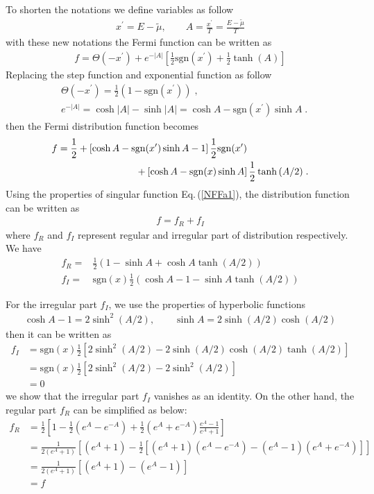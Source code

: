 \documentclass[sn-mathphys,Numbered]{sn-jnl}
\theoremstyle{thmstyleone}%
\theoremstyle{thmstyletwo}%
\theoremstyle{thmstylethree}%
\begin{document}
To shorten the notations we define variables as follow
\begin{align}
x^\prime=E-\tilde\mu,\qquad A = \frac{x^\prime}{T}= \frac{E-\tilde\mu}{T}
\end{align}
with these new notations the Fermi function can be written as
\begin{align}
f=\Theta(-x^\prime)+e^{-|A|}\left[\frac{1}{2}\mathrm{sgn}\left(x^\prime\right) 
 +\frac{1}{2}\tanh\left(A\right)\right]
\end{align}
Replacing the step function and exponential function as  follow
 \begin{align}\label{NFF4}
&\Theta(-x^\prime)=\frac 1 2 (1-\mathrm{sgn}(x^\prime))\;,\\ 
&e^{-|A|}=\cosh|A|-\sinh|A|=\cosh A- \mathrm{sgn}(x^\prime)\sinh A\;.
\end{align}
then the Fermi distribution function becomes
\begin{align}
f=\frac{1}{2} &+\left[\cosh {A}- \mathrm{sgn}(x^\prime)\sinh{A} -1\right]\frac{1}{2} \mathrm{sgn}(x^\prime)\notag\\
 &\qquad\qquad\qquad+\left[\cosh{A}- \mathrm{sgn}(x)\sinh{A} \right]\frac{1}{2}\tanh{(A/2)}\;.
\end{align}
Using the properties of singular function  Eq.\,(\ref{NFFa1}), the distribution function can be written as
\begin{align}
f=f_R+f_I
\end{align}
where $f_R$ and $f_I$ represent regular and irregular part of distribution respectively. We have
\begin{align}\label{NFF5a}
 f_R=& \frac{1}{2}\left(1-\sinh A +\cosh A \tanh (A/2)\right) \\
 f_I=& \mathrm{sgn}(x) \frac{1}{2} \left(\cosh A-1 - \sinh A \tanh (A/2)\right)
 \label{NFF5b}
\end{align}

For the irregular part $f_I$, we use the properties of hyperbolic functions
\begin{align}
\cosh A-1= 2\sinh^2(A/2), \qquad\sinh A=2 \sinh(A/2) \cosh(A/2)
\end{align}
then it can be written as
\begin{align}
f_I&=\mathrm{sgn}(x) \frac{1}{2} \left[ 2\sinh^2(A/2) - 2 \sinh(A/2) \cosh(A/2) \tanh (A/2)\right]\\
&=\mathrm{sgn}(x) \frac{1}{2}\left[2\sinh^2(A/2)-2\sinh^2(A/2)\right]\\
&=0
\end{align}
we show that the irregular part $f_I$ vanishes as an identity. On the other hand, the regular part $f_R$ can be simplified as below:
\begin{align}
f_R&=\frac{1}{2}\left[1-\frac{1}{2}\left(e^A-e^{-A}\right)+\frac{1}{2}\left(e^A+e^{-A}\right)\frac{e^A-1}{e^A+1}\right]\\
&=\frac{1}{2(e^A+1)}\left[\left(e^A+1\right)-\frac{1}{2}\left[\left(e^A+1\right)\left(e^A-e^{-A}\right)-\left(e^A-1\right)\left(e^A+e^{-A}\right)\right]\right]\\
&=\frac{1}{2(e^A+1)}\left[\left(e^A+1\right)-\left(e^A-1\right)\right]\\
&=f
\end{align}
\end{document}
